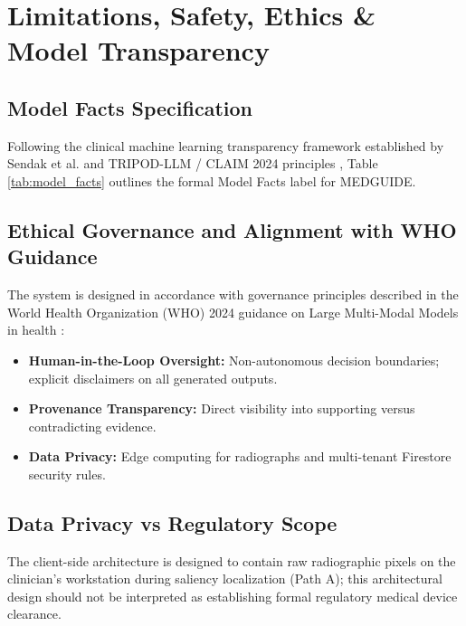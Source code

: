 \documentclass[journal,10pt,twocolumn]{IEEEtran}
\begin{document}
\section{Limitations, Safety, Ethics \& Model Transparency}

\subsection{Model Facts Specification}
Following the clinical machine learning transparency framework established by Sendak et al. \cite{sendak2020real} and TRIPOD-LLM / CLAIM 2024 principles \cite{claim2024}, Table \ref{tab:model_facts} outlines the formal Model Facts label for MEDGUIDE.

\subsection{Ethical Governance and Alignment with WHO Guidance}
The system is designed in accordance with governance principles described in the World Health Organization (WHO) 2024 guidance on Large Multi-Modal Models in health \cite{who2024lmm}:
\begin{itemize}
    \item \textbf{Human-in-the-Loop Oversight:} Non-autonomous decision boundaries; explicit disclaimers on all generated outputs.
    \item \textbf{Provenance Transparency:} Direct visibility into supporting versus contradicting evidence.
    \item \textbf{Data Privacy:} Edge computing for radiographs and multi-tenant Firestore security rules.
\end{itemize}

\subsection{Data Privacy vs Regulatory Scope}
The client-side architecture is designed to contain raw radiographic pixels on the clinician's workstation during saliency localization (Path A); this architectural design should not be interpreted as establishing formal regulatory medical device clearance.
\end{document}
